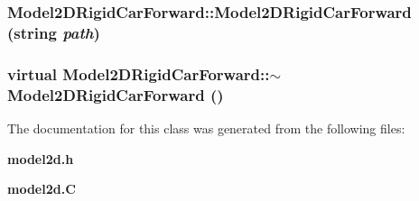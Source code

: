 \subsubsection{\setlength{\rightskip}{0pt plus 5cm}Model2DRigid\-Car\-Forward::Model2DRigid\-Car\-Forward (string {\em path})}\label{classModel2DRigidCarForward_a0}


\subsubsection{\setlength{\rightskip}{0pt plus 5cm}virtual Model2DRigid\-Car\-Forward::$\sim$Model2DRigid\-Car\-Forward ()\hspace{0.3cm}{\tt  [inline, virtual]}}\label{classModel2DRigidCarForward_a1}




The documentation for this class was generated from the following files:\begin{CompactItemize}
\item 
{\bf model2d.h}\item 
{\bf model2d.C}\end{CompactItemize}
